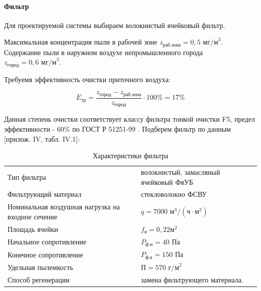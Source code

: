 \paragraph{Фильтр}
Для проектируемой системы выбираем волокнистый ячейковый фильтр.

Максимальная концентрация пыли в рабочей зоне $z_\text{раб.зона} = 0,5 \text{ мг/м}^3$.
Содержание пыли в наружном воздухе непромышленного города $z_\text{город} = 0,6 \text{ мг/м}^3$.

Требуемя эффективность очистки приточного воздуха:

$$
    E_\text{тр} = \frac{z_\text{город} - z_\text{раб.зона}}{z_\text{город}} \cdot 100 \% = 17 \%
$$

Данная степень очистки соответствует классу фильтра тонкой очистки F5, предел
эффективности - 60\% по ГОСТ Р 51251-99 \cite{ecology_gost_51251_99}.
Подберем фильтр по данным \cite{air_ventilation_and_conditioning}[прилож. IV, табл. IV.1]:

\begin{table}[ht]
    \centering
    \begin{tabular}{l|l}
        \hline
        Тип фильтра                                         & волокнистый, замасляный ячейковый ФяУБ            \\
        Фильтрующий материал                                & стекловолокно ФСВУ                                \\
        Номинальная воздушная нагрузка на входное сечение   & $q = 7000 \text{ м}^3/(\text{ч} \cdot \text{м}^2)$\\
        Площадь ячейки                                      & $f_\text{я} = 0,22 \text{м}^2 $                   \\
        Начальное сопротивление                             & $P_\text{ф.н} = 40 \text{ Па}$                    \\
        Конечное сопротивление                              & $P_\text{ф.к} = 150 \text{ Па}$                   \\
        Удельная пылемкость                                 & $\text{П} = 570 \text{ г/м}^2$                    \\
        Способ регенерации                                  & замена фильтрующего материала.                    \\
        \hline
    \end{tabular}
    \caption{Характеристики фильтра}
\end{table}

